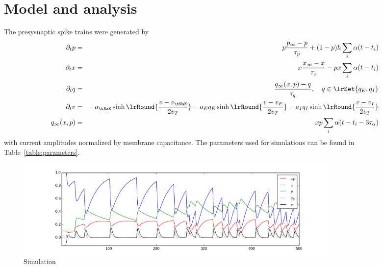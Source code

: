 \documentclass[10pt]{article}
\begin{document}
\section{Model and analysis}

The presysnaptic spike trains were generated by 
\begin{eqnarray}
\partial_t p &=& p \frac{p_{\infty} - p}{\tau_p} + (1-p)
h \sum_{i}{\alpha(t-t_i)} 
\label{eq:dpdt}
\\
\partial_t x &=& x \frac{x_{\infty} - x}{\tau_x} - p x \sum_{i}{\alpha(t-t_i)} 
\label{eq:dxdt}
\\
\partial_t q &=& \frac{q_{\infty}(x,p) - q}{\tau_q}, \quad q \in
\lrSet{q_E, q_I}
\label{eq:dqdt}
\\
\partial_t v &=& - a_{\tNaK} \sinh\lrRound{
  \frac{v-v_{\tNaK}}{2v_T}}
- a_{E} q_E \sinh\lrRound{ \frac{v-v_{E}}{2v_T}}
- a_{I} q_I \sinh\lrRound{ \frac{v-v_{I}}{2v_T}}
\\
q_{\infty}(x,p) &=&  x p \sum_{i}{\alpha(t-t_i- 3\tau_{\alpha} )} 
\label{eq:dqdt}
\end{eqnarray}
with current amplitudes normalized by membrane capacitance.  The
parameters used for simulations can be found in
Table~\ref{table:parameters}.

\begin{figure}[h]
\includegraphics[width=0.8\textwidth]{figuresVoltageFluctuations/xpqv}
\caption{Simulation }
\end{figure}
\end{document}
